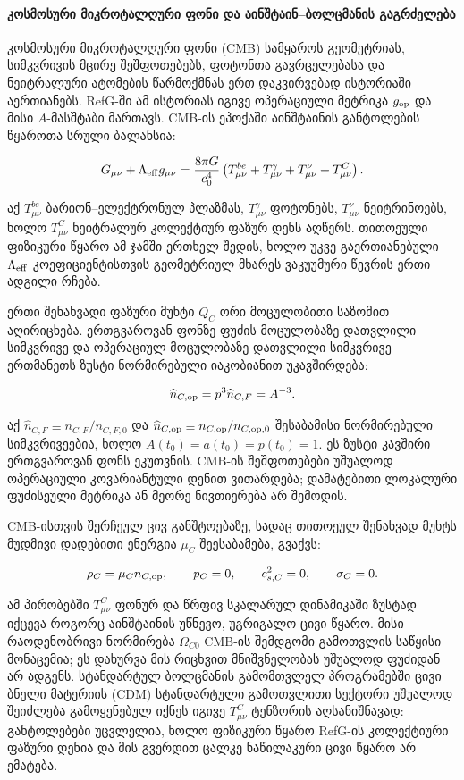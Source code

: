 \documentclass[11pt,a4paper]{article}
\begin{document}
\paragraph{კოსმოსური მიკროტალღური ფონი და აინშტაინ–ბოლცმანის გაგრძელება}

კოსმოსური მიკროტალღური ფონი (CMB) სამყაროს გეომეტრიას, სიმკვრივის მცირე შეშფოთებებს, ფოტონთა გავრცელებასა და ნეიტრალური ატომების წარმოქმნას ერთ დაკვირვებად ისტორიაში აერთიანებს. RefG-ში ამ ისტორიას იგივე ოპერაციული მეტრიკა $g_{\rm op}$ და მისი $A$-მასშტაბი მართავს. CMB-ის ეპოქაში აინშტაინის განტოლების წყაროთა სრული ბალანსია:

\[
G_{\mu\nu}+\Lambda_{\rm eff}g_{\mu\nu}
=\frac{8\pi G}{c_0^4}
\left(T^{be}_{\mu\nu}+T^\gamma_{\mu\nu}+T^\nu_{\mu\nu}+T^C_{\mu\nu}\right).
\]

აქ $T^{be}_{\mu\nu}$ ბარიონ–ელექტრონულ პლაზმას, $T^\gamma_{\mu\nu}$ ფოტონებს, $T^\nu_{\mu\nu}$ ნეიტრინოებს, ხოლო $T^C_{\mu\nu}$ ნეიტრალურ კოლექტიურ ფაზურ დენს აღწერს. თითოეული ფიზიკური წყარო ამ ჯამში ერთხელ შედის, ხოლო უკვე გაერთიანებული $\Lambda_{\rm eff}$ კოეფიციენტისთვის გეომეტრიულ მხარეს ვაკუუმური წევრის ერთი ადგილი რჩება.

ერთი შენახვადი ფაზური მუხტი $Q_C$ ორი მოცულობითი საზომით აღირიცხება. ერთგვაროვან ფონზე ფუძის მოცულობაზე დათვლილი სიმკვრივე და ოპერაციულ მოცულობაზე დათვლილი სიმკვრივე ერთმანეთს ზუსტი ნორმირებული იაკობიანით უკავშირდება:

\[
\widehat n_{C,{\rm op}}=p^3\widehat n_{C,F}=A^{-3}.
\]

აქ $\widehat n_{C,F}\equiv n_{C,F}/n_{C,F,0}$ და $\widehat n_{C,{\rm op}}\equiv n_{C,{\rm op}}/n_{C,{\rm op},0}$ შესაბამისი ნორმირებული სიმკვრივეებია, ხოლო $A(t_0)=a(t_0)=p(t_0)=1$. ეს ზუსტი კავშირი ერთგვაროვან ფონს ეკუთვნის. CMB-ის შეშფოთებები უშუალოდ ოპერაციული კოვარიანტული დენით ვითარდება; დამატებითი ლოკალური ფუძისეული მეტრიკა ან მეორე ნივთიერება არ შემოდის.

CMB-ისთვის შერჩეულ ცივ განშტოებაზე, სადაც თითოეულ შენახვად მუხტს მუდმივი დადებითი ენერგია $\mu_C$ შეესაბამება, გვაქვს:

\[
\rho_C=\mu_C n_{C,{\rm op}},\qquad
p_C=0,\qquad c_{s,C}^2=0,\qquad \sigma_C=0.
\]

ამ პირობებში $T^C_{\mu\nu}$ ფონურ და წრფივ სკალარულ დინამიკაში ზუსტად იქცევა როგორც აინშტაინის უწნევო, უგრიგალო ცივი წყარო. მისი რაოდენობრივი ნორმირება $\Omega_{C0}$ CMB-ის შემდგომი გამოთვლის საწყისი მონაცემია; ეს დახურვა მის რიცხვით მნიშვნელობას უშუალოდ ფუძიდან არ ადგენს. სტანდარტულ ბოლცმანის გამომთვლელ პროგრამებში ცივი ბნელი მატერიის (CDM) სტანდარტული გამოთვლითი სექტორი უშუალოდ შეიძლება გამოყენებულ იქნეს იგივე $T^C_{\mu\nu}$ ტენზორის აღსანიშნავად: განტოლებები უცვლელია, ხოლო ფიზიკური წყარო RefG-ის კოლექტიური ფაზური დენია და მის გვერდით ცალკე ნაწილაკური ცივი წყარო არ ემატება.
\end{document}
